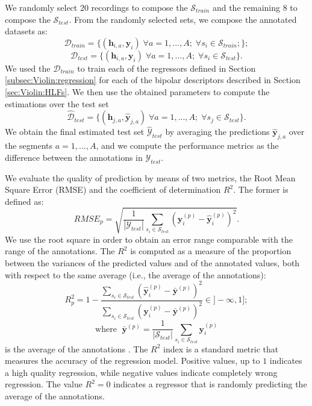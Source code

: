 We randomly select $20$ recordings to compose the $\mathcal{S}_{train}$ and the remaining $8$ to compose the $\mathcal{S}_{test}$. From the randomly selected sets, we compose the annotated datasets as:
\begin{equation}
\mathcal{D}_{train}=\{ (\mathbf{h}_{i,a}, \mathbf{y}_i) \; \forall a=1,...,A; \; \forall s_i \in \mathcal{S}_{train};  \};
\end{equation}
\begin{equation}
\mathcal{D}_{test}=\{ (\mathbf{h}_{i,a}, \mathbf{y}_i)\; \forall a=1,...,A; \; \forall s_i \in \mathcal{S}_{test} \}.
\end{equation}
We used the $\mathcal{D}_{train}$ to train each of the regressors defined in Section \ref{subsec:Violin:regression} for each of the bipolar descriptors described in Section \ref{sec:Violin:HLFs}. We then use the obtained parameters to compute the estimations over the test set 
\begin{equation}
\hat{\mathcal{D}}_{test}=\{ (\mathbf{h}_{j,a}, \hat{\mathbf{y}}_{j,a}) \; \forall a=1,...,A; \; \forall s_j \in \mathcal{S}_{test} \}.
\end{equation}
We obtain the final estimated test set $\hat{\mathcal{Y}}_{test}$ by averaging the predictions $\hat{\mathbf{y}}_{j,a}$ over the segments $a=1,...,A$, and we compute the performance metrics as the difference between the annotations in $\mathcal{Y}_{test}$. 

We evaluate the quality of prediction by means of two metrics, the Root Mean Square Error (RMSE) and the coefficient of determination $R^2$. The former is defined as:
\begin{equation}
RMSE_{p}=\sqrt{\frac{1}{|\mathcal{Y}_{test}|} \sum_{s_i \in \mathcal{S}_{test}}  (\mathbf{y}_i^{(p)}-\hat{\mathbf{y}}_i^{(p)} )^2  }.
\end{equation}
We use the root square in order to obtain an error range comparable with the range of the annotations.
The $R^2$ is computed as a measure of the proportion between the variances of the predicted values and of the annotated values, both with respect to the same average (i.e., the average of the annotations):
\begin{equation}
R^2_p=  1-\frac{\sum_{s_i \in \mathcal{S}_{test}}  (\hat{\mathbf{y}}_i^{(p)}-\bar{\mathbf{y}}^{(p)} )^2 }{\sum_{s_i \in \mathcal{S}_{test}}  (\mathbf{y}_i^{(p)}-\bar{\mathbf{y}}^{(p)} )^2 } \in ]-\infty, 1 ]; 
\end{equation}
\begin{equation}
\text{where }\; \bar{\mathbf{y}}^{(p)}=\frac{1}{|\mathcal{S}_{test}|}\sum_{s_i \in \mathcal{S}_{test}} \mathbf{y}_i^{(p)}
\end{equation}
 is the average of the annotations \cite{Sen1990}. The $R^2$ index is a standard metric that measures the accuracy of the regression model. Positive values, up to $1$ indicates a high quality regression, while negative values indicate completely wrong regression. The value $R^2=0$ indicates a regressor that is randomly predicting the average of the annotations.


